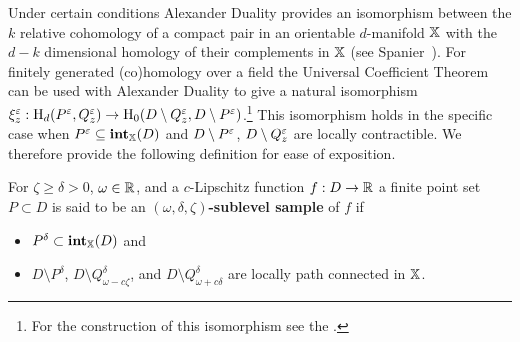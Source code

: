 Under certain conditions Alexander Duality provides an isomorphism between the $k$ relative cohomology of a compact pair in an orientable $d$-manifold $\mathbb{X}$ with the $d - k$ dimensional homology of their complements in $\mathbb{X}$ (see Spanier~\cite{spanier1989algebraic}).
For finitely generated (co)homology over a field the Universal Coefficient Theorem can be used with Alexander Duality to give a natural isomorphism $\xi_z^\varepsilon : \mathrm{H}_d(P^\varepsilon,Q_z^\varepsilon)\to \mathrm{H}_0(D\setminus Q_z^\varepsilon, D\setminus P^\varepsilon)$.\footnote{For the construction of this isomorphism see the \fullversion.}
This isomorphism holds in the specific case when $P^\varepsilon\subseteq \mathbf{int}_{\mathbb{X}}(D)$ and $D\setminus P^\varepsilon$, $D\setminus Q_z^\varepsilon$ are locally contractible.
We therefore provide the following definition for ease of exposition.
\begin{definition}
  For $\zeta\geq \delta > 0$, $\omega\in\mathbb{R}$, and a $c$-Lipschitz function $f: D\to \mathbb{R}$ a finite point set $P\subset D$ is said to be an \textbf{$(\omega, \delta, \zeta)$-sublevel sample} of $f$ if \begin{itemize}
    \item $P^\delta\subset\mathbf{int}_{\mathbb{X}}(D)$ and
    \item $D\setminus P^\delta$, $D\setminus Q_{\omega-c\zeta}^\delta$, and $D\setminus Q_{\omega+c\delta}^\delta$ are locally path connected in $\mathbb{X}$.
  \end{itemize}
\end{definition}

